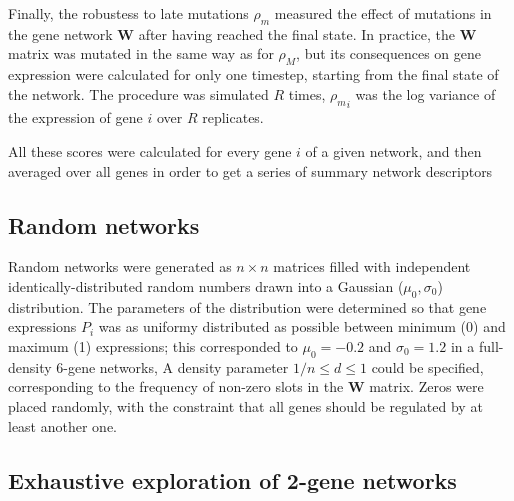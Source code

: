 \documentclass{article}
\newcommand{\earlymut}{{\rho_M}}
\newcommand{\latemut}{{\rho_m}}
\begin{document}
Finally, the robustess to late mutations $\latemut$ measured the effect of mutations in the gene network $\bm W$ after having reached the final state. In practice, the $\bm W$ matrix was mutated in the same way as for $\earlymut$, but its consequences on gene expression were calculated for only one timestep, starting from the final state of the network. The procedure was simulated $R$ times, $\latemut_i$ was the log variance of the expression of gene $i$ over $R$ replicates. 

All these scores were calculated for every gene $i$ of a given network, and then averaged over all genes in order to get a series of summary network descriptors 

\subsection{Random networks}

Random networks were generated as $n\times n$ matrices filled with independent identically-distributed random numbers drawn into a Gaussian ($\mu_0, \sigma_0$) distribution. The parameters of the distribution were determined so that gene expressions $P_i$ was as uniformy distributed as possible between minimum (0) and maximum (1) expressions; this corresponded to $\mu_0=-0.2$ and $\sigma_0=1.2$ in a full-density 6-gene networks, A density parameter $1/n \leq d \leq 1$ could be specified, corresponding to the frequency of non-zero slots in the $\bm W$ matrix. Zeros were placed randomly, with the constraint that all genes should be regulated by at least another one. 

\subsection{Exhaustive exploration of 2-gene networks}
\end{document}
